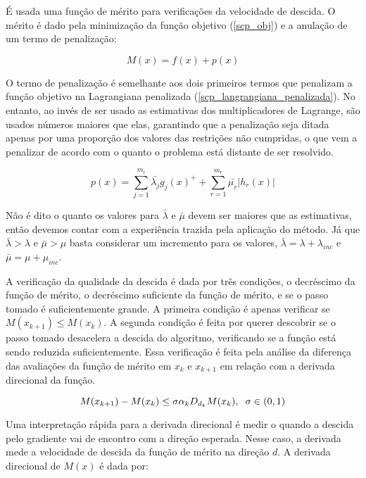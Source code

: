 \noindent
É usada uma função de mérito para verificações da velocidade de descida. O mérito é dado pela
minimização da função objetivo (\ref{scp_obj}) e a anulação de um termo de penalização:

\begin{equation}
  M(x) = f(x) + p(x)
\end{equation}


O termo de penalização é semelhante aos dois primeiros termos que penalizam a função objetivo
na Lagrangiana penalizada (\ref{scp_langrangiana_penalizada}). No entanto, ao invés de ser
usado as estimativas dos multiplicadores de Lagrange, são usados números maiores que elas,
garantindo que a penalização seja ditada apenas por uma proporção dos valores das restrições
não cumpridas, o que vem a penalizar de acordo com o quanto o problema está distante de ser
resolvido.


\begin{equation}
\label{penalidade_merito}
 p(x) = \sum_{j=1}^{m_i} \bar{\lambda_j} g_j(x)^+ + \sum_{r=1}^{m_r} \bar{\mu_r} |h_r(x)|
\end{equation}


Não é dito o quanto os valores para \(\bar{\lambda}\) e \(\bar{\mu}\) devem ser maiores que
as estimativas, então devemos contar com a experiência trazida pela aplicação do método.
Já que \(\bar{\lambda} > \lambda\) e \(\bar{\mu} > \mu\) basta considerar um incremento
para os valores, \(\bar{\lambda} = \lambda + \lambda_{inc}\) e  \(\bar{\mu} = \mu + \mu_{inc}\).


A verificação da qualidade da descida é dada por três condições, o decréscimo da função de mérito, o decréscimo
suficiente da função de mérito, e se o passo tomado é suficientemente grande. A primeira
condição é apenas verificar se \(M(x_{k+1}) \leq M(x_k)\). A segunda condição é feita
por querer descobrir se o passo tomado desacelera a descida do algoritmo, verificando
se a função está sendo reduzida suficientemente. Essa verificação é feita pela análise
da diferença das avaliações da função de mérito em \(x_k\) e \(x_{k+1}\) em relação
com a derivada direcional da função.

\begin{equation}
  M(x_{k+1}) - M(x_k) \leq \sigma \alpha_k D_{d_k} M(x_k), \hspace{0.2cm} \sigma \in (0, 1)
\end{equation}

Uma interpretação rápida para a derivada direcional é medir o quando a descida pelo
gradiente vai de encontro com a direção esperada. Nesse caso, a derivada mede a velocidade
de descida da função de mérito na direção \(d\). A derivada direcional de \(M(x)\) é dada
por:


